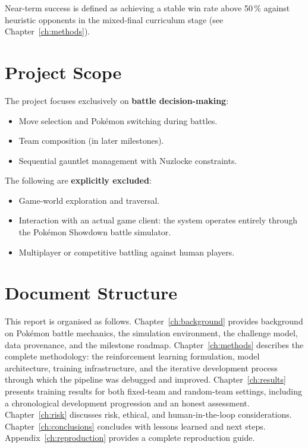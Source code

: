 Near-term success is defined as achieving a stable win rate above 50\,\%
against heuristic opponents in the mixed-final curriculum stage (see
Chapter~\ref{ch:methods}).

\section{Project Scope}

The project focuses exclusively on \textbf{battle decision-making}:

\begin{itemize}
  \item Move selection and Pok\'{e}mon switching during battles.
  \item Team composition (in later milestones).
  \item Sequential gauntlet management with Nuzlocke constraints.
\end{itemize}

The following are \textbf{explicitly excluded}:

\begin{itemize}
  \item Game-world exploration and traversal.
  \item Interaction with an actual game client: the system operates entirely
        through the Pok\'{e}mon Showdown battle simulator.
  \item Multiplayer or competitive battling against human players.
\end{itemize}

\section{Document Structure}

This report is organised as follows.  Chapter~\ref{ch:background} provides
background on Pok\'{e}mon battle mechanics, the simulation environment, the
challenge model, data provenance, and the milestone roadmap.
Chapter~\ref{ch:methods} describes the complete methodology: the
reinforcement learning formulation, model architecture, training
infrastructure, and the iterative development process through which the
pipeline was debugged and improved.
Chapter~\ref{ch:results} presents training results for both fixed-team and
random-team settings, including a chronological development progression and
an honest assessment.  Chapter~\ref{ch:risk} discusses risk, ethical, and
human-in-the-loop considerations.  Chapter~\ref{ch:conclusions} concludes
with lessons learned and next steps.  Appendix~\ref{ch:reproduction} provides
a complete reproduction guide.
